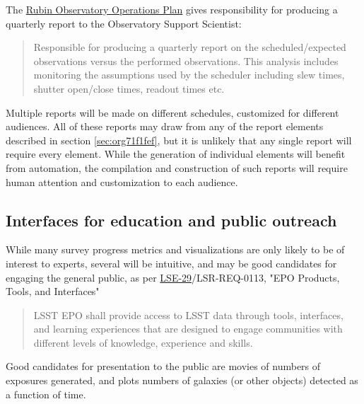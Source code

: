 The \href{https://docushare.lsst.org/docushare/dsweb/Get/Document-36797/Rubin\%20Observatory\%20Operations\%20Plan\%20April\%202020.pdf}{Rubin Observatory Operations Plan} gives responsibility for producing a quarterly report to the Observatory Support Scientist:
\begin{quote}
Responsible for producing a quarterly report on the scheduled/expected observations versus the performed observations. This analysis includes monitoring the assumptions used by the scheduler including slew times, shutter open/close times, readout times etc. 
\end{quote}

Multiple reports will be made on different schedules, customized for different audiences.
All of these reports may draw from any of the report elements described in section \ref{sec:org71f1fef}, but it is unlikely that any single report will require every element.
While the generation of individual elements will benefit from automation, the compilation and construction of such reports will require human attention and customization to each audience.

\subsection{Interfaces for education and public outreach}
\label{sec:org1009c9d}
While many survey progress metrics and visualizations are only likely to be of interest to experts, several will be intuitive, and may be good candidates for engaging the general public, as per \href{https://ls.st/lse-29}{LSE-29}/LSR-REQ-0113, "EPO Products, Tools, and Interfaces"
\begin{quote}
LSST EPO shall provide access to LSST data through tools, interfaces,
and learning experiences that are designed to engage communities with
different levels of knowledge, experience and skills.
\end{quote}
Good candidates for presentation to the public are movies of numbers of exposures generated, and plots numbers of galaxies (or other objects) detected as a function of time.
